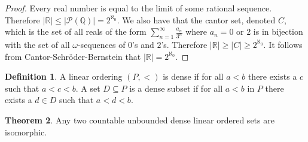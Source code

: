 \documentclass{article}
\theoremstyle{definition}
\newtheorem{thm}{Theorem}[section]
\newtheorem{defn}[thm]{Definition}
\newcommand{\powset}[1]{\mathcal{P}(#1)}
\newcommand{\Q}{\mathbb{Q}}
\newcommand{\R}{\mathbb{R}}
\newcommand{\abs}[1]{\lvert#1\rvert}
\begin{document}
\begin{proof}
    Every real number is equal to the limit of some rational sequence. Therefore $\abs{\R} \le \abs{\powset{\Q}} = 2^{\aleph_0}$. We also have that the cantor set, denoted $C$, which is the set of all reals of the form $\sum_{n = 1}^\infty \frac{a_n}{3^n}$ where $a_n = 0$ or $2$ is in bijection with the set of all $\omega$-sequences of $0$'s and $2$'s. Therefore $\abs{\R} \ge \abs{C} \ge 2^{\aleph_0}$. It follows from Cantor-Schr{\"o}der-Bernstein that $\abs{\R} = 2^{\aleph_0}$.
\end{proof}

\begin{defn}
    A linear ordering $(P, <)$ is dense if for all $a < b$ there exists a $c$ such that $a < c < b$. A set $D \subseteq P$ is a dense subset if for all $a < b$ in $P$ there exists a $d \in D$ such that $a < d < b$.
\end{defn}

\begin{thm}
    Any two countable unbounded dense linear ordered sets are isomorphic.
\end{thm}
\end{document}
